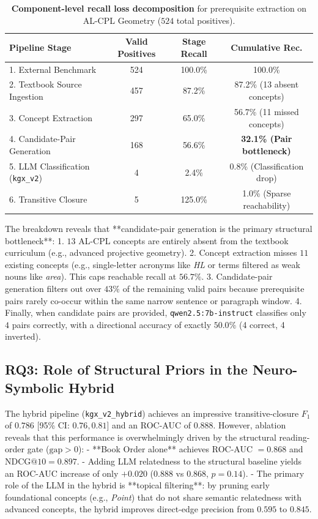 \documentclass[11pt,a4paper]{article}
\begin{document}
\begin{table}[h]
\centering
\small
\begin{tabular}{lccc}
\toprule
\textbf{Pipeline Stage} & \textbf{Valid Positives} & \textbf{Stage Recall} & \textbf{Cumulative Rec.} \\
\midrule
1. External Benchmark & 524 & 100.0\% & 100.0\% \\
2. Textbook Source Ingestion & 457 & 87.2\% & 87.2\% (13 absent concepts) \\
3. Concept Extraction & 297 & 65.0\% & 56.7\% (11 missed concepts) \\
4. Candidate-Pair Generation & 168 & 56.6\% & \textbf{32.1\% (Pair bottleneck)} \\
5. LLM Classification (\texttt{kgx\_v2}) & 4 & 2.4\% & 0.8\% (Classification drop) \\
6. Transitive Closure & 5 & 125.0\% & 1.0\% (Sparse reachability) \\
\bottomrule
\end{tabular}
\caption{\textbf{Component-level recall loss decomposition} for prerequisite extraction on AL-CPL Geometry ($524$ total positives).}
\label{tab:bottleneck}
\end{table}

The breakdown reveals that **candidate-pair generation is the primary structural bottleneck**:
1. $13$ AL-CPL concepts are entirely absent from the textbook curriculum (e.g., advanced projective geometry).
2. Concept extraction misses $11$ existing concepts (e.g., single-letter acronyms like \textit{HL} or terms filtered as weak nouns like \textit{area}). This caps reachable recall at $56.7\%$.
3. Candidate-pair generation filters out over $43\%$ of the remaining valid pairs because prerequisite pairs rarely co-occur within the same narrow sentence or paragraph window.
4. Finally, when candidate pairs are provided, \texttt{qwen2.5:7b-instruct} classifies only $4$ pairs correctly, with a directional accuracy of exactly $50.0\%$ (4 correct, 4 inverted).

\subsection{RQ3: Role of Structural Priors in the Neuro-Symbolic Hybrid}

The hybrid pipeline (\texttt{kgx\_v2\_hybrid}) achieves an impressive transitive-closure $F_1$ of $0.786$ [95\% CI: $0.76, 0.81$] and an ROC-AUC of $0.888$. However, ablation reveals that this performance is overwhelmingly driven by the structural reading-order gate ($\text{gap} > 0$):
- **Book Order alone** achieves ROC-AUC $= 0.868$ and $\text{NDCG@10} = 0.897$.
- Adding LLM relatedness to the structural baseline yields an ROC-AUC increase of only $+0.020$ ($0.888$ vs $0.868$, $p = 0.14$).
- The primary role of the LLM in the hybrid is **topical filtering**: by pruning early foundational concepts (e.g., \textit{Point}) that do not share semantic relatedness with advanced concepts, the hybrid improves direct-edge precision from $0.595$ to $0.845$.
\end{document}
